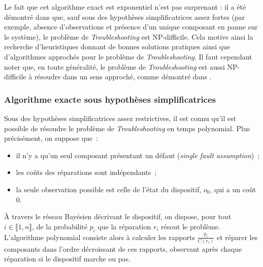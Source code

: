 \documentclass[a4paper,11pt]{article}
\theoremstyle{plain}
\theoremstyle{definition}
\begin{document}
Le fait que cet algorithme exact est exponentiel n'est pas surprenant : il a été démontré dans \cite{Vomlelov__2003} que, sauf sous des hypothèses simplificatrices assez fortes (par exemple, absence d'observations et présence d'un unique composant en panne sur le système), le problème de \emph{Troubleshooting} est NP-difficile. Cela motive ainsi la recherche d'heuristiques donnant de bonnes solutions pratiques ainsi que d'algorithmes approchés pour le problème de \emph{Troubleshooting}. Il faut cependant noter que, en toute généralité, le problème de \emph{Troubleshooting} est aussi NP-difficile à résoudre dans un sens approché, comme démontré dans \cite{L_n_2014}.

\subsubsection{Algorithme exacte sous hypothèses simplificatrices}
\label{SecAlgoSimple}

Sous des hypothèses simplificatrices assez restrictives, il est connu \cite{heckerman1994troubleshooting, Heckerman_1995, Vomlelov__2003, L_n_2014} qu'il est possible de résoudre le problème de \emph{Troubleshooting} en temps polynomial. Plus précisément, on suppose que~:
\begin{itemize}
\item il n'y a qu'un seul composant présentant un défaut (\emph{single fault assumption})~;
\item les coûts des réparations sont indépendants~; 
\item la seule observation possible est celle de l'état du dispositif, $o_0$, qui a un coût $0$.
\end{itemize}
À travers le réseau Bayésien décrivant le dispositif, on dispose, pour tout $i \in \llbracket 1, n\rrbracket$, de la probabilité $p_i$ que la réparation $r_i$ résout le problème. L'algorithme polynomial consiste alors à calculer les rapports $\frac{p_i}{C(r_i)}$ et réparer les composants dans l'ordre décroissant de ces rapports, observant après chaque réparation si le dispositif marche ou pas.

\end{document}
